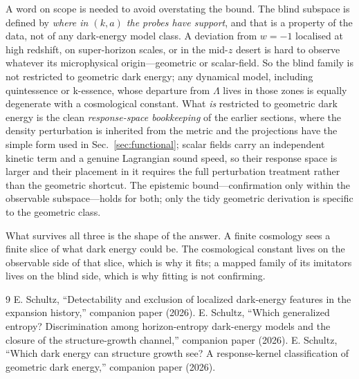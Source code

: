\documentclass[twocolumn,10pt]{article}
\begin{document}
A word on scope is needed to avoid overstating the bound. The blind subspace is
defined by \emph{where in $(k,a)$ the probes have support}, and that is a
property of the data, not of any dark-energy model class. A deviation from
$w=-1$ localised at high redshift, on super-horizon scales, or in the mid-$z$
desert is hard to observe whatever its microphysical origin---geometric or
scalar-field. So the blind family is not restricted to geometric dark energy;
any dynamical model, including quintessence or k-essence, whose departure from
$\Lambda$ lives in those zones is equally degenerate with a cosmological
constant. What \emph{is} restricted to geometric dark energy is the clean
\emph{response-space bookkeeping} of the earlier sections, where the density
perturbation is inherited from the metric and the projections have the simple
form used in Sec.~\ref{sec:functional}; scalar fields carry an independent
kinetic term and a genuine Lagrangian sound speed, so their response space is
larger and their placement in it requires the full perturbation treatment rather
than the geometric shortcut. The epistemic bound---confirmation only within the
observable subspace---holds for both; only the tidy geometric derivation is
specific to the geometric class.

What survives all three is the shape of the answer. A finite cosmology sees a
finite slice of what dark energy could be. The cosmological constant lives on
the observable side of that slice, which is why it fits; a mapped family of its
imitators lives on the blind side, which is why fitting is not confirming.

\begin{thebibliography}{9}
 E. Schultz, ``Detectability and exclusion of localized
dark-energy features in the expansion history,'' companion paper (2026).
 E. Schultz, ``Which generalized entropy?
Discrimination among horizon-entropy dark-energy models and the closure of the
structure-growth channel,'' companion paper (2026).
 E. Schultz, ``Which dark energy can structure growth see?
A response-kernel classification of geometric dark energy,'' companion paper
(2026).
\end{thebibliography}
\end{document}
